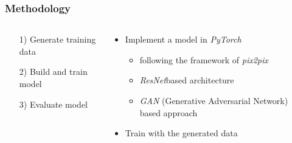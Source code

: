 \documentclass[18pt]{beamer}
\newcommand{\semitransp}[2][35]{\color{fg!#1}#2 \color{fg}}
\begin{document}
\begin{frame}[t]
  \frametitle{Methodology}
  \begin{columns}[t]
    \begin{column}{0.4\textwidth}
      \begin{itemize}
      \item[1)] \semitransp{Generate training data}
      \item[2)] Build and train model
      \item[3)] \semitransp{Evaluate model}
      \end{itemize}
    \end{column}
    \begin{column}{0.6\textwidth}
      \begin{itemize}
      \item Implement a model in \textit{PyTorch}
        \begin{itemize}
          \item following the framework of \textit{pix2pix}
          \item \textit{ResNet}\footnotemark \@ based architecture
          \item \textit{GAN} (Generative Adversarial Network) based approach
          \end{itemize}
          \item Train with the generated data
      \end{itemize}
    \end{column}
  \end{columns}
\end{frame}
\end{document}

